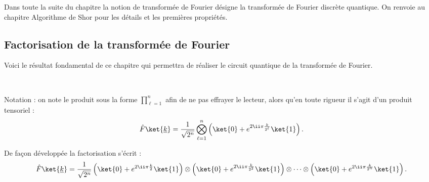 \documentclass[11pt,class=report,crop=false]{standalone}
\begin{document}
Dans toute la suite du chapitre la notion de \og{}transformée de Fourier\fg{} désigne la transformée de Fourier discrète quantique.
On renvoie au chapitre \og{}Algorithme de Shor\fg{} pour les détails et les premières propriétés.

\subsection{Factorisation de la transformée de Fourier}

Voici le résultat fondamental de ce chapitre qui permettra de réaliser le circuit quantique de la transformée de Fourier.

\begin{theoreme}
\label{th:factor}
~
\end{theoreme}

Notation : on note le produit sous la forme $\prod_{\ell=1}^{n}$ afin de ne pas effrayer le lecteur, alors qu'en toute rigueur il s'agit d'un produit tensoriel : 
$$
\hat F \ket{\underline k} 
= \frac{1}{\sqrt{2^n}} \bigotimes_{\ell=1}^{n} 
\left( \ket{0} + e^{2\ii \pi \frac{k}{2^\ell}} \ket{1} \right)
.$$

De façon développée la factorisation s'écrit :
$$\hat F \ket{\underline k} 
= \frac{1}{\sqrt{2^n}} 
\left( \ket{0} + e^{2\ii \pi \frac{k}{2}} \ket{1} \right)
\otimes \left( \ket{0} + e^{2\ii \pi \frac{k}{2^2}} \ket{1} \right)
\otimes \cdots \otimes
\left( \ket{0} + e^{2\ii \pi \frac{k}{2^n}} \ket{1} \right).
$$
\end{document}
